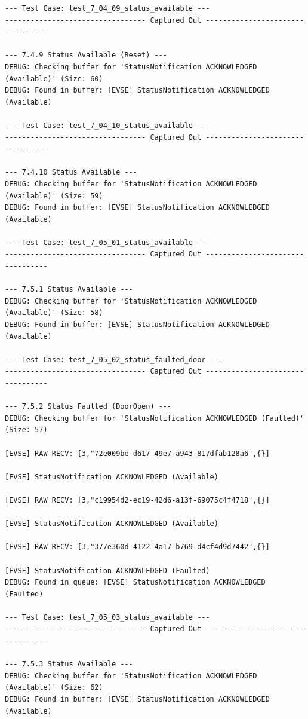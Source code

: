 \documentclass{article}
\begin{document}
\begin{lstlisting}
--- Test Case: test_7_04_09_status_available ---
--------------------------------- Captured Out ---------------------------------

--- 7.4.9 Status Available (Reset) ---
DEBUG: Checking buffer for 'StatusNotification ACKNOWLEDGED (Available)' (Size: 60)
DEBUG: Found in buffer: [EVSE] StatusNotification ACKNOWLEDGED (Available)

--- Test Case: test_7_04_10_status_available ---
--------------------------------- Captured Out ---------------------------------

--- 7.4.10 Status Available ---
DEBUG: Checking buffer for 'StatusNotification ACKNOWLEDGED (Available)' (Size: 59)
DEBUG: Found in buffer: [EVSE] StatusNotification ACKNOWLEDGED (Available)

--- Test Case: test_7_05_01_status_available ---
--------------------------------- Captured Out ---------------------------------

--- 7.5.1 Status Available ---
DEBUG: Checking buffer for 'StatusNotification ACKNOWLEDGED (Available)' (Size: 58)
DEBUG: Found in buffer: [EVSE] StatusNotification ACKNOWLEDGED (Available)

--- Test Case: test_7_05_02_status_faulted_door ---
--------------------------------- Captured Out ---------------------------------

--- 7.5.2 Status Faulted (DoorOpen) ---
DEBUG: Checking buffer for 'StatusNotification ACKNOWLEDGED (Faulted)' (Size: 57)

[EVSE] RAW RECV: [3,"72e009be-d617-49e7-a943-817dfab128a6",{}]

[EVSE] StatusNotification ACKNOWLEDGED (Available)

[EVSE] RAW RECV: [3,"c19954d2-ec19-42d6-a13f-69075c4f4718",{}]

[EVSE] StatusNotification ACKNOWLEDGED (Available)

[EVSE] RAW RECV: [3,"377e360d-4122-4a17-b769-d4cf4d9d7442",{}]

[EVSE] StatusNotification ACKNOWLEDGED (Faulted)
DEBUG: Found in queue: [EVSE] StatusNotification ACKNOWLEDGED (Faulted)

--- Test Case: test_7_05_03_status_available ---
--------------------------------- Captured Out ---------------------------------

--- 7.5.3 Status Available ---
DEBUG: Checking buffer for 'StatusNotification ACKNOWLEDGED (Available)' (Size: 62)
DEBUG: Found in buffer: [EVSE] StatusNotification ACKNOWLEDGED (Available)


\end{lstlisting}
\end{document}
